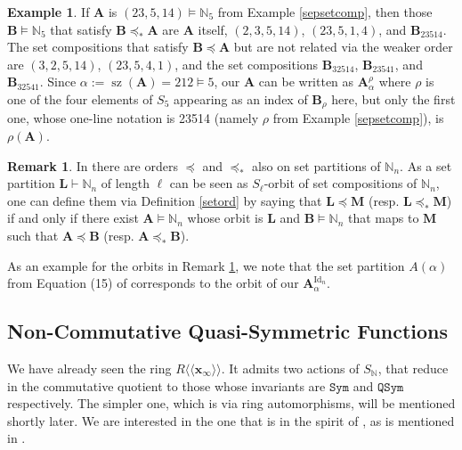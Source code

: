 \documentclass{article}
\theoremstyle{definition}
\newtheorem{rmk}[thm]{Remark}
\newtheorem{ex}[thm]{Example}
\begin{document}
\begin{ex}
If $\mathbf{A}$ is $(23,5,14)\vDash\mathbb{N}_{5}$ from Example \ref{sepsetcomp}, then those $\mathbf{B}\vDash\mathbb{N}_{5}$ that satisfy $\mathbf{B}\preceq_{*}\mathbf{A}$ are $\mathbf{A}$ itself, $(2,3,5,14)$, $(23,5,1,4)$, and $\mathbf{B}_{23514}$. The set compositions that satisfy $\mathbf{B}\preceq\mathbf{A}$ but are not related via the weaker order are $(3,2,5,14)$, $(23,5,4,1)$, and the set compositions $\mathbf{B}_{32514}$, $\mathbf{B}_{23541}$, and $\mathbf{B}_{32541}$. Since $\alpha:=\operatorname{sz}(\mathbf{A})=212\vDash5$, our $\mathbf{A}$ can be written as $\mathbf{A}_{\alpha}^{\rho}$ where $\rho$ is one of the four elements of $S_{5}$ appearing as an index of $\mathbf{B}_{\rho}$ here, but only the first one, whose one-line notation is 23514 (namely $\rho$ from Example \ref{sepsetcomp}), is $\rho(\mathbf{A})$. \label{refAex}
\end{ex}

\begin{rmk}
In \cite{[BZ]} there are orders $\preceq$ and $\preceq_{*}$ also on set partitions of $\mathbb{N}_{n}$. As a set partition $\mathbf{L}\vdash\mathbb{N}_{n}$ of length $\ell$ can be seen as $S_{\ell}$-orbit of set compositions of $\mathbb{N}_{n}$, one can define them via Definition \ref{setord} by saying that $\mathbf{L}\preceq\mathbf{M}$ (resp. $\mathbf{L}\preceq_{*}\mathbf{M}$) if and only if there exist $\mathbf{A}\vDash\mathbb{N}_{n}$ whose orbit is $\mathbf{L}$ and $\mathbf{B}\vDash\mathbb{N}_{n}$ that maps to $\mathbf{M}$ such that $\mathbf{A}\preceq\mathbf{B}$ (resp. $\mathbf{A}\preceq_{*}\mathbf{B}$). \label{partord}
\end{rmk}
As an example for the orbits in Remark \ref{partord}, we note that the set partition $A(\alpha)$ from Equation (15) of \cite{[BRRZ]} corresponds to the orbit of our $\mathbf{A}_{\alpha}^{\operatorname{Id}_{n}}$.

\subsection{Non-Commutative Quasi-Symmetric Functions}

We have already seen the ring $R\langle\langle\mathbf{x}_{\infty}\rangle\rangle$. It admits two actions of $S_{\mathbb{N}}$, that reduce in the commutative quotient to those whose invariants are $\mathtt{Sym}$ and $\mathtt{QSym}$ respectively. The simpler one, which is via ring automorphisms, will be mentioned shortly later. We are interested in the one that is in the spirit of \cite{[Hi2]}, as is mentioned in \cite{[Hi1]}.
\end{document}
